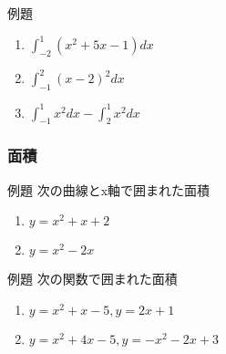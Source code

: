 \documentclass[10pt,dvipdfmx]{jsarticle}
\begin{document}
\begin{itembox}[l]{例題}
  \begin{large}
    \begin{enumerate}
      \item $\int_{-2}^{1}(x^2+5x-1)dx$
      \item $\int_{-1}^{2}(x-2)^2dx$
      \item $\int_{-1}^{1}x^2dx-\int_{2}^{1}x^2dx$
    \end{enumerate}
  \end{large}
\end{itembox}


\subsubsection*{面積}
\begin{itembox}[l]{例題}
  次の曲線とx軸で囲まれた面積
  \begin{large}
    \begin{enumerate}
      \item $y=x^2+x+2$
      \item $y=x^2-2x$
    \end{enumerate}
  \end{large}
\end{itembox}

\begin{itembox}[l]{例題}
  次の関数で囲まれた面積
  \begin{large}
    \begin{enumerate}
      \item $y=x^2+x-5, y=2x+1$
      \item $y=x^2+4x-5, y=-x^2-2x+3$
    \end{enumerate}
  \end{large}
\end{itembox}
\end{document}
